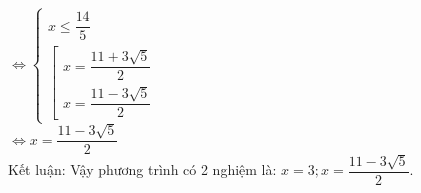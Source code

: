 $ \Leftrightarrow 
\begin{cases}
     x \leq \dfrac{14}{5} \\
     \left[
         \begin{array}{l}
             x = \dfrac{11+3 \sqrt{5}}{2} \\
             x = \dfrac{11-3 \sqrt{5}}{2} 
         \end{array}
     \right. 
\end{cases} 
 $ \\ 
$ \Leftrightarrow 
             x = \dfrac{11-3 \sqrt{5}}{2}  $ \\ 

Kết luận: Vậy phương trình có 2 nghiệm là: $ x=3 ;  x = \dfrac{11-3 \sqrt{5}}{2}   $.

